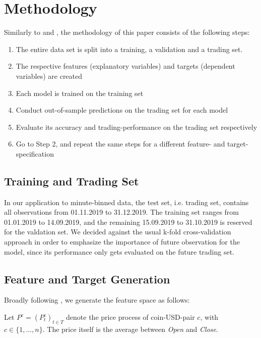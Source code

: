 \section{Methodology}
Similarly to 
\cite{krauss2016arbitrageSandP} 
and \cite{krauss2019statisticalArbitrage},
the methodology of this paper consists of
the following steps:

\begin{enumerate}
    \item The entire data set is split into a training, a validation and a trading set.
    \item The respective features (explanatory variables) and targets (dependent variables) are created
    \item Each model is trained on the training set
    \item Conduct out-of-sample predictions on the trading set for each model 
    \item Evaluate its accuracy and trading-performance on the trading set respectively
    \item Go to Step 2, and repeat the same steps for a different feature- and target-specification
\end{enumerate}



\subsection{Training and Trading Set} \label{ch:training_trading}
In our application to minute-binned data, the test set, i.e. trading set, contains all observations from 01.11.2019 to 31.12.2019.
The training set ranges from 01.01.2019 to 14.09.2019, and the remaining 15.09.2019 to 31.10.2019 
is reserved for the valdation set. We decided against the usual k-fold cross-validation approach 
in order to emphasize the importance of future observation for the model, since its performance only gets
evaluated on the future trading set.



\subsection{Feature and Target Generation} \label{ch:feature_and_target}
Broadly following \cite{takeuchi2013momentumTrading},
we generate the feature space as follows:

Let $ P^{c} = ( P^{c}_{t} )_{t \in T} $ denote the price process of coin-USD-pair $ c $, with $ c \in \{1, ... , n\} $. The price itself is the average between \textit{Open} and \textit{Close}.

